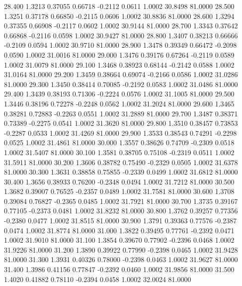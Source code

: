   28.400   1.3213   0.37055   0.66718  -0.2112   0.0611   1.0002  30.8498  81.0000
  28.500   1.3251   0.37178   0.66850  -0.2115   0.0606   1.0002  30.8836  81.0000
  28.600   1.3294   0.37355   0.66908  -0.2117   0.0602   1.0002  30.9144  81.0000
  28.700   1.3343   0.37642   0.66868  -0.2116   0.0598   1.0002  30.9427  81.0000
  28.800   1.3407   0.38213   0.66666  -0.2109   0.0594   1.0002  30.9710  81.0000
  28.900   1.3478   0.39349   0.66472  -0.2098   0.0590   1.0002  31.0016  81.0000
  29.000   1.3476   0.39176   0.67264  -0.2119   0.0589   1.0002  31.0079  81.0000
  29.100   1.3468   0.38923   0.68144  -0.2142   0.0588   1.0002  31.0164  81.0000
  29.200   1.3459   0.38664   0.69074  -0.2166   0.0586   1.0002  31.0286  81.0000
  29.300   1.3450   0.38414   0.70085  -0.2192   0.0583   1.0002  31.0486  81.0000
  29.400   1.3439   0.38193   0.71306  -0.2224   0.0576   1.0002  31.1005  81.0000
  29.500   1.3446   0.38196   0.72278  -0.2248   0.0562   1.0002  31.2024  81.0000
  29.600   1.3465   0.38281   0.72883  -0.2263   0.0551   1.0002  31.2889  81.0000
  29.700   1.3487   0.38371   0.73389  -0.2275   0.0541   1.0002  31.3620  81.0000
  29.800   1.3510   0.38457   0.73853  -0.2287   0.0533   1.0002  31.4269  81.0000
  29.900   1.3533   0.38543   0.74291  -0.2298   0.0525   1.0002  31.4861  81.0000
  30.000   1.3557   0.38626   0.74709  -0.2309   0.0518   1.0002  31.5407  81.0000
  30.100   1.3581   0.38705   0.75108  -0.2319   0.0511   1.0002  31.5911  81.0000
  30.200   1.3606   0.38782   0.75490  -0.2329   0.0505   1.0002  31.6378  81.0000
  30.300   1.3631   0.38858   0.75855  -0.2339   0.0499   1.0002  31.6812  81.0000
  30.400   1.3656   0.38933   0.76200  -0.2348   0.0494   1.0002  31.7212  81.0000
  30.500   1.3682   0.39007   0.76525  -0.2357   0.0489   1.0002  31.7581  81.0000
  30.600   1.3708   0.39084   0.76827  -0.2365   0.0485   1.0002  31.7921  81.0000
  30.700   1.3735   0.39167   0.77105  -0.2373   0.0481   1.0002  31.8232  81.0000
  30.800   1.3762   0.39257   0.77356  -0.2380   0.0477   1.0002  31.8515  81.0000
  30.900   1.3791   0.39363   0.77576  -0.2387   0.0474   1.0002  31.8774  81.0000
  31.000   1.3822   0.39495   0.77761  -0.2392   0.0471   1.0002  31.9010  81.0000
  31.100   1.3854   0.39670   0.77902  -0.2396   0.0468   1.0002  31.9226  81.0000
  31.200   1.3890   0.39922   0.77990  -0.2398   0.0465   1.0002  31.9428  81.0000
  31.300   1.3931   0.40326   0.78000  -0.2398   0.0463   1.0002  31.9627  81.0000
  31.400   1.3986   0.41156   0.77847  -0.2392   0.0460   1.0002  31.9856  81.0000
  31.500   1.4020   0.41882   0.78110  -0.2394   0.0458   1.0002  32.0024  81.0000
